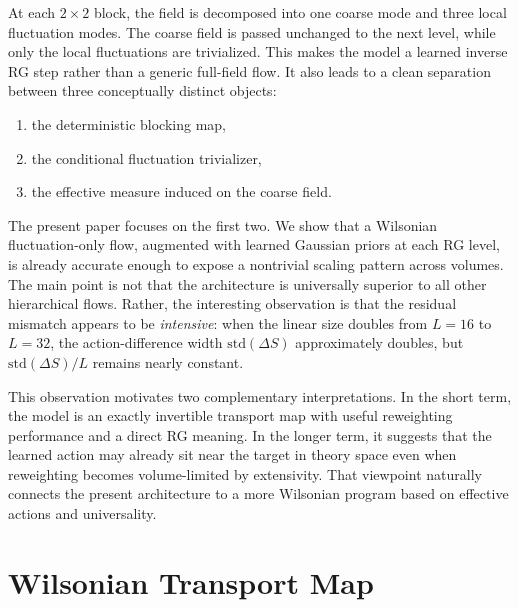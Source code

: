 \documentclass[aps,prd,preprint,nofootinbib,superscriptaddress,longbibliography]{revtex4-2}
\newcommand{\std}{\mathrm{std}}
\begin{document}
At each $2\times2$ block, the field is decomposed into one coarse mode and
three local fluctuation modes. The coarse field is passed unchanged to the next
level, while only the local fluctuations are trivialized. This makes the model a
learned inverse RG step rather than a generic full-field flow. It also leads to
a clean separation between three conceptually distinct objects:
\begin{enumerate}
\item the deterministic blocking map,
\item the conditional fluctuation trivializer,
\item the effective measure induced on the coarse field.
\end{enumerate}

The present paper focuses on the first two. We show that a Wilsonian
fluctuation-only flow, augmented with learned Gaussian priors at each RG level,
is already accurate enough to expose a nontrivial scaling pattern across
volumes. The main point is not that the architecture is universally superior to
all other hierarchical flows. Rather, the interesting observation is that the
residual mismatch appears to be \emph{intensive}: when the linear size doubles
from $L=16$ to $L=32$, the action-difference width $\std(\Delta S)$
approximately doubles, but $\std(\Delta S)/L$ remains nearly constant.

This observation motivates two complementary interpretations. In the short term,
the model is an exactly invertible transport map with useful reweighting
performance and a direct RG meaning. In the longer term, it suggests that the
learned action may already sit near the target in theory space even when
reweighting becomes volume-limited by extensivity. That viewpoint naturally
connects the present architecture to a more Wilsonian program based on effective
actions and universality.

\section{Wilsonian Transport Map}
\label{sec:wilsonian_map}
\end{document}
